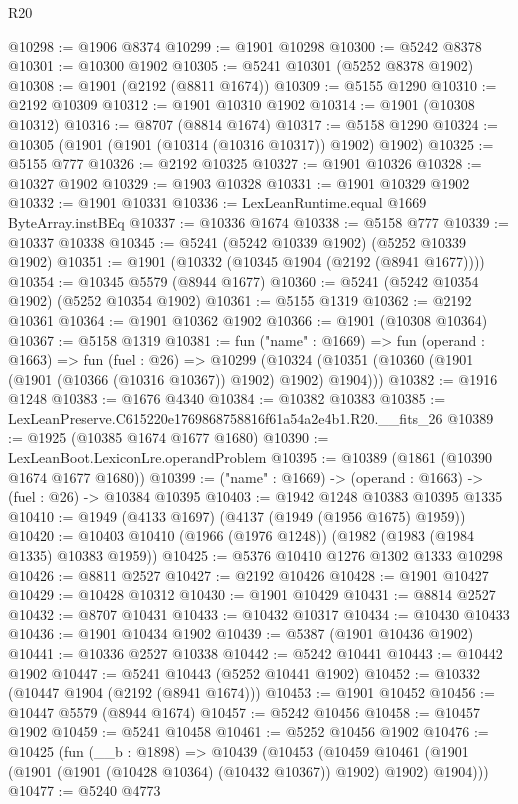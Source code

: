 \begin{lexlean}{R20}
\begin{coremodule}
@10298 := @1906 @8374
@10299 := @1901 @10298
@10300 := @5242 @8378
@10301 := @10300 @1902
@10305 := @5241 @10301 (@5252 @8378 @1902)
@10308 := @1901 (@2192 (@8811 @1674))
@10309 := @5155 @1290
@10310 := @2192 @10309
@10312 := @1901 @10310 @1902
@10314 := @1901 (@10308 @10312)
@10316 := @8707 (@8814 @1674)
@10317 := @5158 @1290
@10324 := @10305 (@1901 (@1901 (@10314 (@10316 @10317)) @1902) @1902)
@10325 := @5155 @777
@10326 := @2192 @10325
@10327 := @1901 @10326
@10328 := @10327 @1902
@10329 := @1903 @10328
@10331 := @1901 @10329 @1902
@10332 := @1901 @10331
@10336 := LexLeanRuntime.equal @1669 ByteArray.instBEq
@10337 := @10336 @1674
@10338 := @5158 @777
@10339 := @10337 @10338
@10345 := @5241 (@5242 @10339 @1902) (@5252 @10339 @1902)
@10351 := @1901 (@10332 (@10345 @1904 (@2192 (@8941 @1677))))
@10354 := @10345 @5579 (@8944 @1677)
@10360 := @5241 (@5242 @10354 @1902) (@5252 @10354 @1902)
@10361 := @5155 @1319
@10362 := @2192 @10361
@10364 := @1901 @10362 @1902
@10366 := @1901 (@10308 @10364)
@10367 := @5158 @1319
@10381 := fun ("name" : @1669) =>
  fun (operand : @1663) =>
  fun (fuel : @26) =>
  @10299 (@10324 (@10351 (@10360 (@1901 (@1901 (@10366 (@10316 @10367)) @1902) @1902) @1904)))
@10382 := @1916 @1248
@10383 := @1676 @4340
@10384 := @10382 @10383
@10385 := LexLeanPreserve.C615220e1769868758816f61a54a2e4b1.R20.__fits_26
@10389 := @1925 (@10385 @1674 @1677 @1680)
@10390 := LexLeanBoot.LexiconLre.operandProblem
@10395 := @10389 (@1861 (@10390 @1674 @1677 @1680))
@10399 := ("name" : @1669) -> (operand : @1663) -> (fuel : @26) -> @10384 @10395
@10403 := @1942 @1248 @10383 @10395 @1335
@10410 := @1949 (@4133 @1697) (@4137 (@1949 (@1956 @1675) @1959))
@10420 := @10403 @10410 (@1966 (@1976 @1248)) (@1982 (@1983 (@1984 @1335) @10383 @1959))
@10425 := @5376 @10410 @1276 @1302 @1333 @10298
@10426 := @8811 @2527
@10427 := @2192 @10426
@10428 := @1901 @10427
@10429 := @10428 @10312
@10430 := @1901 @10429
@10431 := @8814 @2527
@10432 := @8707 @10431
@10433 := @10432 @10317
@10434 := @10430 @10433
@10436 := @1901 @10434 @1902
@10439 := @5387 (@1901 @10436 @1902)
@10441 := @10336 @2527 @10338
@10442 := @5242 @10441
@10443 := @10442 @1902
@10447 := @5241 @10443 (@5252 @10441 @1902)
@10452 := @10332 (@10447 @1904 (@2192 (@8941 @1674)))
@10453 := @1901 @10452
@10456 := @10447 @5579 (@8944 @1674)
@10457 := @5242 @10456
@10458 := @10457 @1902
@10459 := @5241 @10458
@10461 := @5252 @10456 @1902
@10476 := @10425
    (fun (__b : @1898) =>
    @10439
      (@10453
        (@10459 @10461 (@1901 (@1901 (@1901 (@10428 @10364) (@10432 @10367)) @1902) @1902) @1904)))
@10477 := @5240 @4773

\end{coremodule}
\end{lexlean}

